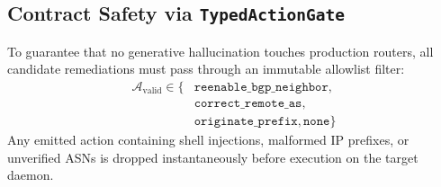 \documentclass[conference]{IEEEtran}
\begin{document}
\subsection{Contract Safety via \texttt{TypedActionGate}}
To guarantee that no generative hallucination touches production routers, all candidate remediations must pass through an immutable allowlist filter:
\begin{equation}
\begin{aligned}
\mathcal{A}_{\text{valid}} \in \{ &\mathtt{reenable\_bgp\_neighbor}, \\
&\mathtt{correct\_remote\_as}, \\
&\mathtt{originate\_prefix}, \mathtt{none} \}
\end{aligned}
\end{equation}
Any emitted action containing shell injections, malformed IP prefixes, or unverified ASNs is dropped instantaneously before execution on the target daemon.
\end{document}
